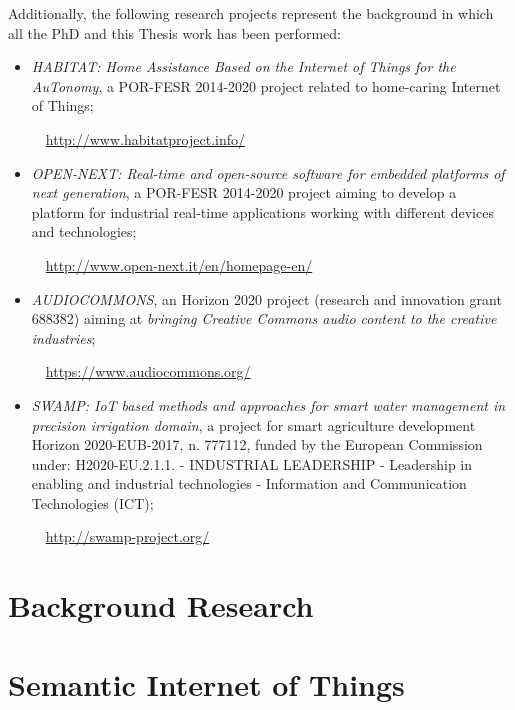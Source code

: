 \documentclass[11pt, twoside, openright]{report}   	%
\newcommand*{\bulletimg}[1]{%
  \raisebox{-.3\baselineskip}{%
    \texttt{[image: \#1]}%
  }%
}
\begin{document}
Additionally, the following research projects represent the background in which all the PhD and this Thesis work has been performed:
\begin{itemize}
\item[\bulletimg{habitatLogo.jpg}] \textit{HABITAT: Home Assistance Based on the Internet of Things for the AuTonomy}, a POR-FESR 2014-2020 project related to home-caring Internet of Things;
\begin{center}
\faLink~~\url{http://www.habitatproject.info/}
\end{center}

\item[\bulletimg{open-next.png}] \textit{OPEN-NEXT: Real-time and open-source software for embedded platforms of next generation}, a POR-FESR 2014-2020 project aiming to develop a platform for industrial real-time applications working with different devices and technologies;
\begin{center}
\faLink~~\url{http://www.open-next.it/en/homepage-en/}
\end{center}

\item[\bulletimg{audio-commons.png}] \textit{AUDIOCOMMONS}, an Horizon 2020 project (research and innovation grant 688382) aiming at \textit{bringing Creative Commons audio content to the creative industries};
\begin{center}
\faLink~~\url{https://www.audiocommons.org/}
\end{center}

\item[\bulletimg{swamp.png}] \textit{SWAMP: IoT based methods and approaches for smart water management in precision irrigation domain}, a project for smart agriculture development Horizon 2020-EUB-2017, n. 777112, funded by the European Commission under: H2020-EU.2.1.1. - INDUSTRIAL LEADERSHIP - Leadership in enabling and industrial technologies - Information and Communication Technologies (ICT);
\begin{center}
\faLink~~\url{http://swamp-project.org/}
\end{center}
\end{itemize}

\chapter{Background Research}
\label{ch:background}

\clearpage

\chapter{Semantic Internet of Things}
\label{ch:iot}

\clearpage
\end{document}
